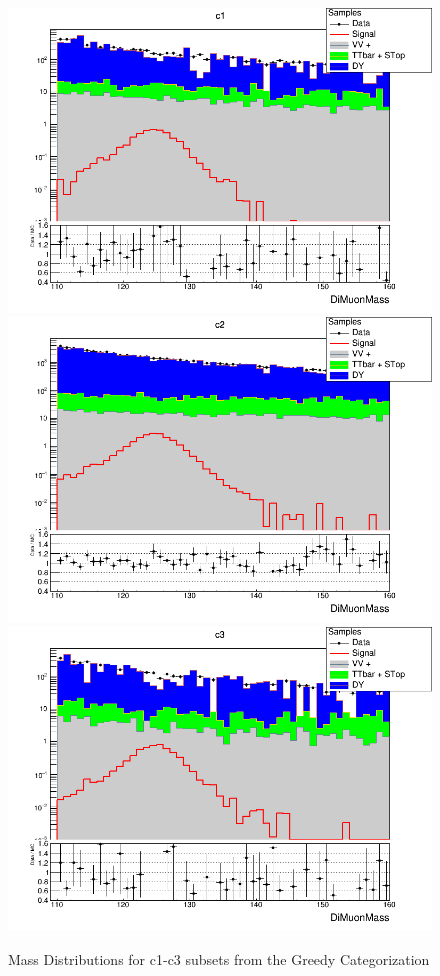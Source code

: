 \begin{figure}[H]
  \centering
  \includegraphics[width=0.65\linewidth]{figures/ch_higgs/distributions/bdt_uf/distribution__c1__DiMuonMass__logY.png}\\
  \includegraphics[width=0.65\linewidth]{figures/ch_higgs/distributions/bdt_uf/distribution__c2__DiMuonMass__logY.png}\\
  \includegraphics[width=0.65\linewidth]{figures/ch_higgs/distributions/bdt_uf/distribution__c3__DiMuonMass__logY.png}
  \caption{Mass Distributions for c1-c3 subsets from the Greedy Categorization}
  \label{fig:higgs_categorization_greedyc1c3}
\end{figure}
